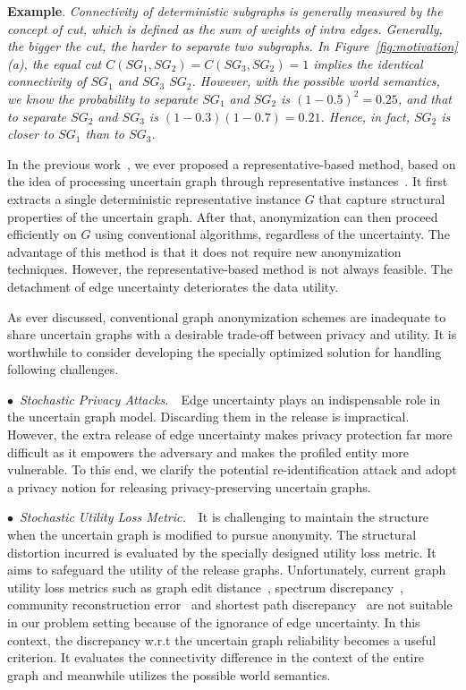 \textbf{Example}. \emph{Connectivity of deterministic subgraphs is generally measured by the concept of cut, which is defined as the sum of weights of intra edges. Generally, the bigger the cut, the harder to separate two subgraphs. In Figure~\ref{fig:motivation}(a), the equal cut $C(SG_{1},SG_{2})=C(SG_{3},SG_{2})=1$ implies the identical connectivity of $SG_{1}$ and $SG_{3}$ {\wrt} $SG_{2}$. However, with the possible world semantics, we know the probability to separate $SG_{1}$ and $SG_{2}$ is $(1-0.5)^{2}=0.25$, and that to separate $SG_{2}$ and $SG_{3}$ is $(1-0.3)(1-0.7)=0.21$. Hence, in fact, $SG_{2}$ is closer to $SG_{1}$ than to $SG_{3}$. }

In the previous work~\cite{Xiao:2018}, we ever proposed a representative-based method, based on the idea of processing uncertain graph through representative instances~\cite{Parchas_Gullo_Papadias_Bonchi_2014}.
It first extracts a single deterministic representative instance $G$ that capture structural properties of the uncertain graph.
After that, anonymization can then proceed efficiently on $G$ using conventional algorithms, regardless of the uncertainty.  
The advantage of this method is that it does not require new anonymization techniques. 
However, the representative-based method is not always feasible. 
The detachment of edge uncertainty deteriorates the data utility. 

As ever discussed, conventional graph anonymization schemes are inadequate to share uncertain graphs with a desirable trade-off between privacy and utility. 
It is worthwhile to consider developing the specially optimized solution for handling following challenges. 

$\bullet$~\textup{\emph{Stochastic Privacy Attacks.}}~~Edge uncertainty plays an indispensable role in the uncertain graph model. Discarding them in the release is impractical.  
However, the extra release of edge uncertainty makes privacy protection far more difficult as it empowers the adversary and makes the profiled entity more vulnerable. 
To this end, we clarify the potential re-identification attack and adopt a privacy notion for releasing privacy-preserving uncertain graphs.

$\bullet$~\textup{\emph{Stochastic Utility Loss Metric.}}~~It is challenging to maintain the structure when the uncertain graph is modified to pursue anonymity. 
The structural distortion incurred is evaluated by the specially designed utility loss metric.  
It aims to safeguard the utility of the release graphs.  
Unfortunately, current graph utility loss metrics such as graph edit distance~\cite{Liu_Towards_2008}, spectrum discrepancy~\cite{Ying_Randomizing_2008}, community reconstruction error~\cite{Wang2011} and shortest path discrepancy~\cite{Liu_Privacy_2009} 
are not suitable in our problem setting because of the ignorance of edge uncertainty.
In this context, the discrepancy w.r.t the uncertain graph reliability becomes a useful criterion. It evaluates the connectivity difference in the context of the entire graph and meanwhile utilizes the possible world semantics. 

